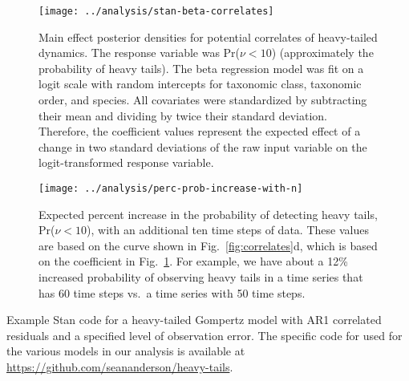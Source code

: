 \clearpage


\begin{figure}[htbp]
\begin{center}
\texttt{[image: ../analysis/stan-beta-correlates]}
\caption{
  Main effect posterior densities for potential correlates of heavy-tailed
  dynamics. The response variable was Pr($\nu < 10$) (approximately the
  probability of heavy tails). The beta regression model was fit on a logit
  scale with random intercepts for taxonomic class, taxonomic order, and
  species. All covariates were standardized by subtracting their mean and
  dividing by twice their standard deviation. Therefore, the coefficient values
  represent the expected effect of a change in two standard deviations of the
  raw input variable on the logit-transformed response variable.
}
    \label{fig:correlate-coefs}
\end{center}
\end{figure}

\begin{figure}[htbp]
\begin{center}
\texttt{[image: ../analysis/perc-prob-increase-with-n]}
\caption{
Expected percent increase in the probability of detecting heavy tails, Pr($\nu
< 10$), with an additional ten time steps of data. These values are based on
the curve shown in Fig.~\ref{fig:correlates}d, which is based on the
coefficient in Fig.~\ref{fig:correlate-coefs}. For example, we have about
a 12\% increased probability of observing heavy tails in a time series that has
60 time steps vs.\ a time series with 50 time steps.
}
\label{fig:perc-inc-p}
\end{center}
\end{figure}

\clearpage

\noindent
Example Stan code for a heavy-tailed Gompertz model with AR1 correlated
residuals and a specified level of observation error. The specific code for used for the various models in our analysis is available at \url{https://github.com/seananderson/heavy-tails}.

